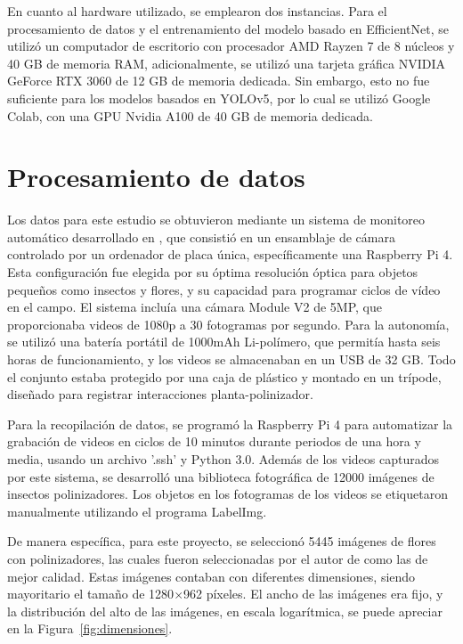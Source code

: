 En cuanto al hardware utilizado, se emplearon dos instancias. Para el procesamiento de datos y el entrenamiento del modelo basado en EfficientNet, se utilizó un computador de escritorio con procesador AMD Rayzen 7 de 8 núcleos y 40 GB de memoria RAM, adicionalmente, se utilizó una tarjeta gráfica NVIDIA GeForce RTX 3060 de 12 GB de memoria dedicada. Sin embargo, esto no fue suficiente para los modelos basados en YOLOv5, por lo cual se utilizó Google Colab, con una GPU Nvidia A100 de 40 GB de memoria dedicada.


\section{Procesamiento de datos}


Los datos para este estudio se obtuvieron mediante un sistema de monitoreo automático desarrollado en \cite{serra-2022}, que consistió en un ensamblaje de cámara controlado por un ordenador de placa única, específicamente una Raspberry Pi 4. Esta configuración fue elegida por su óptima resolución óptica para objetos pequeños como insectos y flores, y su capacidad para programar ciclos de vídeo en el campo. El sistema incluía una cámara Module V2 de 5MP, que proporcionaba videos de 1080p a 30 fotogramas por segundo. Para la autonomía, se utilizó una batería portátil de 1000mAh Li-polímero, que permitía hasta seis horas de funcionamiento, y los videos se almacenaban en un USB de 32 GB. Todo el conjunto estaba protegido por una caja de plástico y montado en un trípode, diseñado para registrar interacciones planta-polinizador.

Para la recopilación de datos, se programó la Raspberry Pi 4 para automatizar la grabación de videos en ciclos de 10 minutos durante periodos de una hora y media, usando un archivo '.ssh' y Python 3.0. Además de los videos capturados por este sistema, se desarrolló una biblioteca fotográfica de 12000 imágenes de insectos polinizadores. Los objetos en los fotogramas de los videos se etiquetaron manualmente utilizando el programa LabelImg.

De manera específica, para este proyecto, se seleccionó 5445 imágenes de flores con polinizadores, las cuales fueron seleccionadas por el autor de \cite{serra-2022} como las de mejor calidad. Estas imágenes contaban con diferentes dimensiones, siendo mayoritario el tamaño de 1280$\times$962 píxeles. El ancho de las imágenes era fijo, y la distribución del alto de las imágenes, en escala logarítmica, se puede apreciar en la Figura~\ref{fig:dimensiones}.

